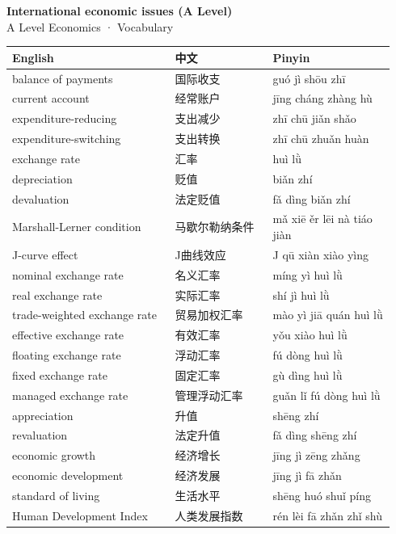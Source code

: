 \documentclass[11pt]{article}
\begin{document}
\begin{center}
  {\LARGE\bfseries International economic issues (A Level)}\\[0.35em]
  {\large A Level Economics · Vocabulary}
\end{center}
\vspace{0.6em}

\begin{longtable}{@{}p{0.40\linewidth}p{0.24\linewidth}p{0.30\linewidth}@{}}
\toprule
\textbf{English} & \textbf{中文} & \textbf{Pinyin} \\
\midrule
\endhead
\bottomrule
\endlastfoot
balance of payments & 国际收支 & guó jì shōu zhī \\
current account & 经常账户 & jīng cháng zhàng hù \\
expenditure-reducing & 支出减少 & zhī chū jiǎn shǎo \\
expenditure-switching & 支出转换 & zhī chū zhuǎn huàn \\
exchange rate & 汇率 & huì lǜ \\
depreciation & 贬值 & biǎn zhí \\
devaluation & 法定贬值 & fǎ dìng biǎn zhí \\
Marshall-Lerner condition & 马歇尔勒纳条件 & mǎ xiē ěr lēi nà tiáo jiàn \\
J-curve effect & J曲线效应 & J qū xiàn xiào yìng \\
nominal exchange rate & 名义汇率 & míng yì huì lǜ \\
real exchange rate & 实际汇率 & shí jì huì lǜ \\
trade-weighted exchange rate & 贸易加权汇率 & mào yì jiā quán huì lǜ \\
effective exchange rate & 有效汇率 & yǒu xiào huì lǜ \\
floating exchange rate & 浮动汇率 & fú dòng huì lǜ \\
fixed exchange rate & 固定汇率 & gù dìng huì lǜ \\
managed exchange rate & 管理浮动汇率 & guǎn lǐ fú dòng huì lǜ \\
appreciation & 升值 & shēng zhí \\
revaluation & 法定升值 & fǎ dìng shēng zhí \\
economic growth & 经济增长 & jīng jì zēng zhǎng \\
economic development & 经济发展 & jīng jì fā zhǎn \\
standard of living & 生活水平 & shēng huó shuǐ píng \\
Human Development Index & 人类发展指数 & rén lèi fā zhǎn zhǐ shù \\

\end{longtable}
\end{document}

